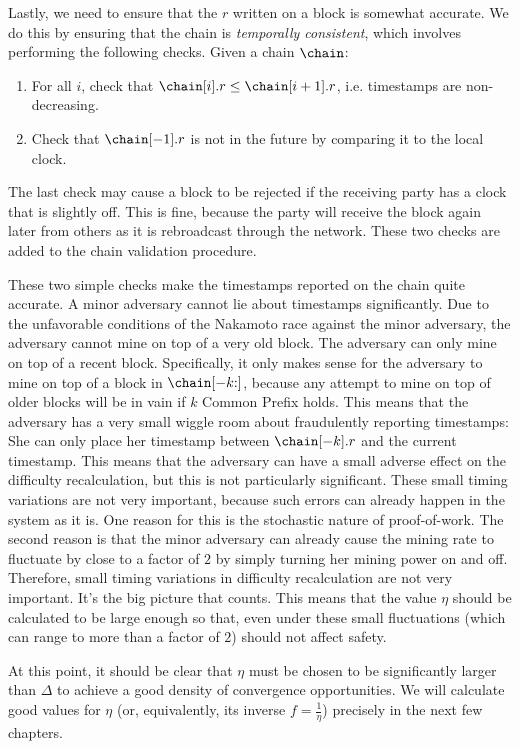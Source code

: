 Lastly, we need to ensure that the $r$ written on a block is somewhat
accurate. We do this by ensuring that the chain is \emph{temporally consistent},
which involves performing the following checks. Given a chain $\chain$:

\begin{enumerate}
  \item For all $i$, check that $\chain[i].r \leq \chain[i + 1].r$, i.e. timestamps are non-decreasing.
  \item Check that $\chain[-1].r$ is not in the future by comparing it to the local clock.
\end{enumerate}

The last check may cause a block to be rejected if the receiving party
has a clock that is slightly off. This is fine, because the party will
receive the block again later from others as it is rebroadcast through
the network. These two checks are added to the chain validation procedure.

These two simple checks make the timestamps reported on the chain quite
accurate. A minor adversary cannot lie about timestamps significantly.
Due to the unfavorable conditions of the Nakamoto race against the minor
adversary, the adversary cannot mine on top of a very old block. The
adversary can only mine on top of a recent block. Specifically, it only
makes sense for the adversary to mine on top of a block in
$\chain[{-k}{:}]$, because any attempt to mine on top of older blocks
will be in vain if $k$ Common Prefix holds. This means that the adversary
has a very small wiggle room about fraudulently reporting timestamps:
She can only place her timestamp between $\chain[{-k}].r$ and the current
timestamp. This means that the adversary can have a small adverse effect
on the difficulty recalculation, but this is not particularly significant.
These small timing variations are not very important, because such errors
can already happen in the system as it is. One reason for this is the
stochastic nature of proof-of-work.
The second reason is that the minor adversary can already cause the mining rate to fluctuate
by close to a factor of $2$ by simply turning her mining power on and off.
Therefore, small timing variations in difficulty recalculation are not very important.
It's the big picture that counts. This means that the value $\eta$ should be
calculated to be large enough so that, even under these small fluctuations
(which can range to more than a factor of $2$) should not affect safety.

At this point, it should be clear that $\eta$ must be chosen to be significantly
larger than $\Delta$ to achieve a good density of convergence opportunities.
We will calculate good values for $\eta$ (or, equivalently, its inverse $f = \frac{1}{\eta}$)
precisely in the next few chapters.

